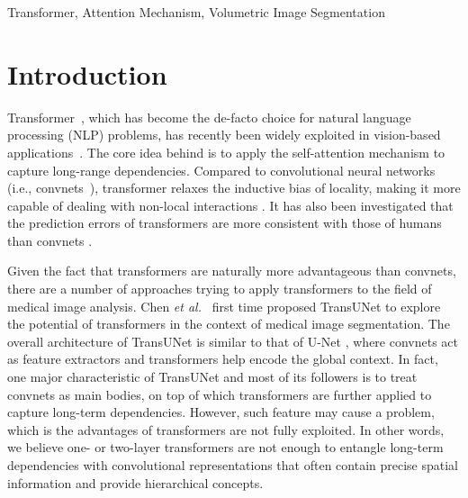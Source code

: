 \documentclass[journal,twoside,web]{ieeecolor}
\newcommand{\etal}{\textit{et al.}}
\begin{document}
\begin{IEEEkeywords}
Transformer, Attention Mechanism, Volumetric Image Segmentation
\end{IEEEkeywords}

\section{Introduction}
\label{sec:introduction}
Transformer~\cite{vaswani2017attention}, which has become the de-facto choice for natural language processing (NLP) problems, has recently been widely exploited in vision-based applications~\cite{dosovitskiy2020image,liu2021swin,he2021masked,carion2020end}. The core idea behind is to apply the self-attention mechanism to capture long-range dependencies. Compared to convolutional neural networks (i.e., convnets~\cite{lecun1998gradient}), transformer relaxes the inductive bias of locality, making it more capable of dealing with non-local interactions \cite{zhou2021convnets,qu2022m3net,zhang2021cross}. It has also been investigated that the prediction errors of transformers are more consistent with those of humans than convnets \cite{tuli2021convolutional}.

Given the fact that transformers are naturally more advantageous than convnets, there are a number of approaches trying to apply transformers to the field of medical image analysis. Chen \etal~\cite{chen2021transunet} first time proposed TransUNet to explore the potential of transformers in the context of medical image segmentation. The overall architecture of TransUNet is similar to that of U-Net \cite{ronneberger2015u}, where convnets act as feature extractors and transformers help encode the global context. In fact, one major characteristic of TransUNet and most of its followers \cite{zhang2021transfuse,valanarasu2021medical,chang2021transclaw,chen2021transattunet} is to treat convnets as main bodies, on top of which transformers are further applied to capture long-term dependencies. However, such feature may cause a problem, which is the advantages of transformers are not fully exploited. In other words, we believe one- or two-layer transformers are not enough to entangle long-term dependencies with convolutional representations that often contain precise spatial information and provide hierarchical concepts.
\end{document}

